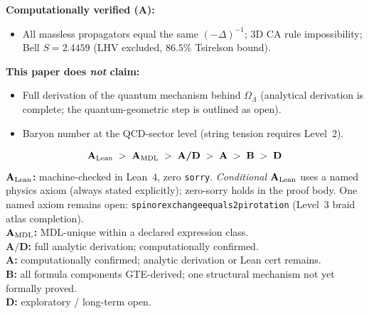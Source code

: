\documentclass[11pt]{article}
\theoremstyle{remark}
\newcommand{\lean}[1]{%
  \penalty-100
  \begingroup\def\_{\textunderscore\allowbreak}\texttt{#1}\endgroup}
\newcommand{\OmegaL}{\Omega_\Lambda}
\newcommand{\CatA}{\textbf{A}}
\newcommand{\CatAL}{\ensuremath{\textbf{A}_{\rm Lean}}}
\newcommand{\CatAMDL}{\ensuremath{\textbf{A}_{\rm MDL}}}
\newcommand{\CatAD}{\textbf{A/D}}
\newcommand{\CatB}{\textbf{B}}
\newcommand{\CatD}{\textbf{D}}
\begin{document}
\begin{tcolorbox}[colback=orange!6,colframe=orange!70!black,
  title={\textbf{What this paper claims and does not claim}},
  fonttitle=\bfseries,left=6pt,right=6pt,top=5pt,bottom=5pt]
\begin{itemize}[noitemsep,topsep=2pt]
\end{itemize}
\textbf{Computationally verified ($\CatA$):}
\begin{itemize}[noitemsep,topsep=2pt]
  \item All massless propagators equal the same $(-\Delta)^{-1}$; 3D CA rule
        impossibility; Bell $S=2.4459$ (LHV excluded, $86.5\%$ Tsirelson bound).
\end{itemize}
\textbf{This paper does \emph{not} claim:}
\begin{itemize}[noitemsep,topsep=2pt]
  \item Full derivation of the quantum mechanism behind $\OmegaL$ (analytical
        derivation is complete; the quantum-geometric step is outlined as open).
  \item Baryon number at the QCD-sector level (string tension requires Level~2).
\end{itemize}
\end{tcolorbox}

\begin{tcolorbox}[colback=gray!4,colframe=gray!50!black,
  title={\textbf{Claim-strength taxonomy}},
  fonttitle=\bfseries,left=6pt,right=6pt,top=5pt,bottom=5pt]
\small
\[
\CatAL \;>\; \CatAMDL \;>\; \CatAD \;>\; \CatA \;>\; \CatB \;>\; \CatD
\]
\textbf{$\CatAL$:} machine-checked in Lean~4, zero \texttt{sorry}.
  \emph{Conditional} $\CatAL$ uses a named physics axiom (always stated explicitly);
  zero-sorry holds in the proof body.
  One named axiom remains open: \lean{spinor\_exchange\_equals\_2pi\_rotation}
  (Level~3 braid atlas completion).\\
\textbf{$\CatAMDL$:} MDL-unique within a declared expression class.\\
\textbf{$\CatAD$:} full analytic derivation; computationally confirmed.\\
\textbf{$\CatA$:} computationally confirmed; analytic derivation or Lean cert remains.\\
\textbf{$\CatB$:} all formula components GTE-derived; one structural mechanism not yet formally proved.\\
\textbf{$\CatD$:} exploratory / long-term open.
\end{tcolorbox}
\end{document}
